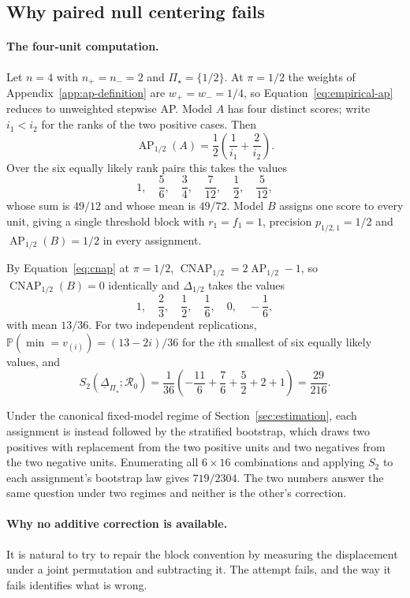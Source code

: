 \documentclass[11pt]{article}
\newcommand{\AP}{\operatorname{AP}}
\newcommand{\CNAP}{\operatorname{CNAP}}
\newcommand{\Regime}{\mathcal{R}}
\newcommand{\PSet}{\Pi_\star}
\newcommand{\Prb}{\mathbb{P}}
\newcommand{\RobDelta}{\underline{\Delta}_{\PSet}}
\theoremstyle{remark}
\begin{document}
\subsection{Why paired null centering fails}
\label{app:paired-null}

\paragraph{The four-unit computation.}
Let $n=4$ with $n_+=n_-=2$ and $\PSet=\{1/2\}$. At $\pi=1/2$ the weights of Appendix~\ref{app:ap-definition} are $w_+=w_-=1/4$, so Equation~\eqref{eq:empirical-ap} reduces to unweighted stepwise AP. Model $A$ has four distinct scores; write $i_1<i_2$ for the ranks of the two positive cases. Then
\[
\AP_{1/2}(A)
=
\frac12
\left(
\frac{1}{i_1}+\frac{2}{i_2}
\right).
\]
Over the six equally likely rank pairs this takes the values
\[
1,\quad
\frac56,\quad
\frac34,\quad
\frac{7}{12},\quad
\frac12,\quad
\frac{5}{12},
\]
whose sum is $49/12$ and whose mean is $49/72$. Model $B$ assigns one score to every unit, giving a single threshold block with $r_1=f_1=1$, precision $p_{1/2,1}=1/2$ and $\AP_{1/2}(B)=1/2$ in every assignment.

By Equation~\eqref{eq:cnap} at $\pi=1/2$, $\CNAP_{1/2}=2\AP_{1/2}-1$, so $\CNAP_{1/2}(B)=0$ identically and $\Delta_{1/2}$ takes the values
\[
1,\quad
\frac23,\quad
\frac12,\quad
\frac16,\quad
0,\quad
-\frac16 ,
\]
with mean $13/36$. For two independent replications, $\Prb(\min=v_{(i)})=(13-2i)/36$ for the $i$th smallest of six equally likely values, and
\[
S_2(\RobDelta;\Regime_0)
=
\frac{1}{36}
\left(
-\frac{11}{6}
+\frac{7}{6}
+\frac52
+2
+1
\right)
=
\frac{29}{216}.
\]

Under the canonical fixed-model regime of Section~\ref{sec:estimation}, each assignment is instead followed by the stratified bootstrap, which draws two positives with replacement from the two positive units and two negatives from the two negative units. Enumerating all $6\times16$ combinations and applying $S_2$ to each assignment's bootstrap law gives $719/2304$. The two numbers answer the same question under two regimes and neither is the other's correction.

\paragraph{Why no additive correction is available.}
\label{app:no-correction}
It is natural to try to repair the block convention by measuring the displacement under a joint permutation and subtracting it. The attempt fails, and the way it fails identifies what is wrong.
\end{document}
